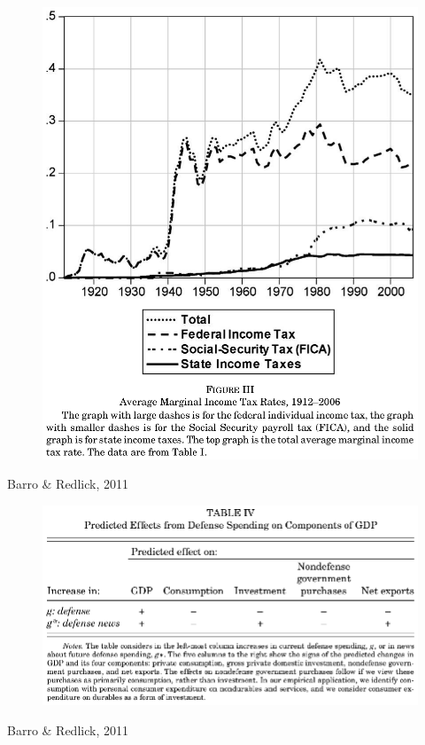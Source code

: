 \documentclass{beamer}
\begin{document}
\begin{frame}
  \begin{figure}
    \includegraphics[scale=.5]{barro_redlick3.eps}
  \end{figure}
  Barro \& Redlick, 2011
\end{frame}

\begin{frame}
  \begin{figure}
    \includegraphics[scale=.5]{barro_redlick4.eps}
  \end{figure}
  Barro \& Redlick, 2011
\end{frame}
\end{document}
